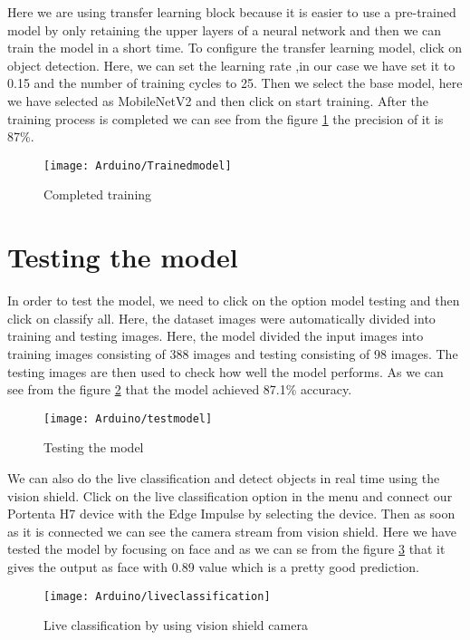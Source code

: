	Here we are using transfer learning block because it is easier to use a pre-trained model by only retaining the upper layers of a neural network and then we can train the model in a short time. To configure the transfer learning model, click on object detection. Here, we can set the learning rate ,in our case we have set it to 0.15 and  the number of training cycles to 25. Then we select the base model, here we have selected as MobileNetV2 and then click on start training.  After the training process is completed we can see from the figure \ref{figure 9.23} the precision of it is 87\%.
	\begin{figure}[H]
		\centering
		\texttt{[image: Arduino/Trainedmodel]}
		\caption{Completed training}
		\label{figure 9.23}
	\end{figure}
	\section{Testing the model }
	In order to test the model, we need to click on the option model testing and then click on classify all. Here, the dataset images were automatically divided into training and testing images. Here, the model divided the input images into training images consisting of 388 images and testing consisting of 98 images. The testing images are then used to check how well the model performs. As we can see from the figure \ref{figure 9.24} that the model achieved 87.1\% accuracy.
	
	\begin{figure}[H]
		\centering
		\texttt{[image: Arduino/testmodel]}
		\caption{Testing the model}
		\label{figure 9.24}
	\end{figure}
	
	We can also do the live classification and detect objects in real time using the vision shield.  Click on the live classification option in the menu and connect our Portenta H7 device with the Edge Impulse by selecting the device. Then as soon as it is connected we can see the camera stream from vision shield. Here we have tested the model by focusing on face and as we can se from the figure \ref{figure 9.25} that it gives the output as face with 0.89 value which is a pretty good prediction.
	\begin{figure}[H]
		\centering
		\texttt{[image: Arduino/liveclassification]}
		\caption{Live classification by using vision shield camera}
		\label{figure 9.25}
	\end{figure}
	
